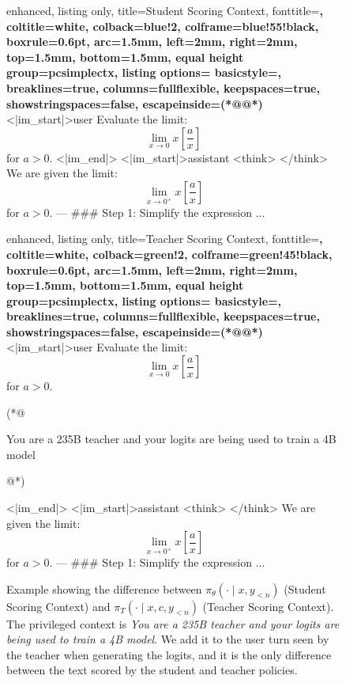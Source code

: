 \begin{figure}
    \centering
    \begin{minipage}[t]{0.48\textwidth}
\begin{tcblisting}{
    enhanced,
    listing only,
    title={Student Scoring Context},
    fonttitle=\bfseries,
    coltitle=white,
    colback=blue!2,
    colframe=blue!55!black,
    boxrule=0.6pt,
    arc=1.5mm,
    left=2mm,
    right=2mm,
    top=1.5mm,
    bottom=1.5mm,
    equal height group=pcsimplectx,
    listing options={
        basicstyle=\ttfamily\scriptsize,
        breaklines=true,
        columns=fullflexible,
        keepspaces=true,
        showstringspaces=false,
        escapeinside={(*@}{@*)}
    }
}
<|im_start|>user
Evaluate the limit: $$\lim_{x\to 0}x \left[ \frac{a}{x}\right]$$ for $a>0$.
<|im_end|>
<|im_start|>assistant
<think>
</think>
We are given the limit:
$$ \lim_{x \to 0^+} x \left[ \frac{a}{x} \right] $$
for $ a > 0 $.
---
### Step 1: Simplify the expression ...
\end{tcblisting}
\end{minipage}%
\hfill
\begin{minipage}[t]{0.48\textwidth}
\begin{tcblisting}{
    enhanced,
    listing only,
    title={Teacher Scoring Context},
    fonttitle=\bfseries,
    coltitle=white,
    colback=green!2,
    colframe=green!45!black,
    boxrule=0.6pt,
    arc=1.5mm,
    left=2mm,
    right=2mm,
    top=1.5mm,
    bottom=1.5mm,
    equal height group=pcsimplectx,
    listing options={
        basicstyle=\ttfamily\scriptsize,
        breaklines=true,
        columns=fullflexible,
        keepspaces=true,
        showstringspaces=false,
        escapeinside={(*@}{@*)}
    }
}
<|im_start|>user
Evaluate the limit: $$\lim_{x\to 0}x \left[ \frac{a}{x}\right]$$ for $a>0$.

(*@\parbox[t]{0.95\linewidth}{\ttfamily\scriptsize\bfseries\color{blue!70!black}\raggedright You are a 235B teacher and your logits are being used to train a 4B model}@*)

<|im_end|>
<|im_start|>assistant
<think>
</think>
We are given the limit:
$$ \lim_{x \to 0^+} x \left[ \frac{a}{x} \right] $$
for $ a > 0 $.
---
### Step 1: Simplify the expression ...
\end{tcblisting}
\end{minipage}
    \caption{Example showing the difference between $\pi_\theta(\cdot \mid x, y_{<n})$ (Student Scoring Context) and $\pi_T(\cdot \mid x, c, y_{<n})$ (Teacher Scoring Context). The privileged context is \emph{You are a 235B teacher and your logits are being used to train a 4B model}. We add it to the user turn seen by the teacher when generating the logits, and it is the only difference between the text scored by the student and teacher policies.}
    \label{fig: pc_example}
\end{figure}


